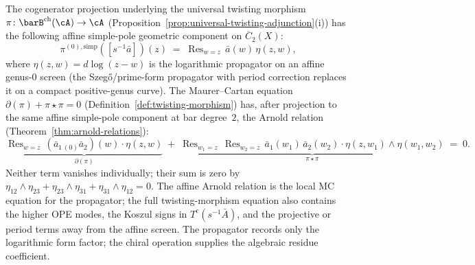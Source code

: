 \begin{proposition}
\label{prop:twisting-morphism-propagator}
The cogenerator projection underlying the universal twisting morphism
$\pi\colon \barB^{\mathrm{ch}}(\cA) \to \cA$
\textup{(}Proposition~\textup{\ref{prop:universal-twisting-adjunction}(i))}
has the following affine simple-pole geometric component on
$\overline C_2(X)$:
\begin{equation}\label{eq:twisting-propagator-config}
\pi^{(0),\mathrm{simp}}([s^{-1}\bar{a}])(z)
\;=\;
\operatorname{Res}_{w=z}\, \bar{a}(w)\,\eta(z,w),
\end{equation}
where $\eta(z,w) = d\log(z - w)$ is the logarithmic propagator on an
affine genus-$0$ screen \textup{(}the Szeg\H{o}/prime-form propagator
with period correction replaces it on a compact positive-genus
curve\textup{)}. The Maurer--Cartan equation
$\partial(\pi) + \pi \star \pi = 0$
\textup{(}Definition~\textup{\ref{def:twisting-morphism})} has, after
projection to the same affine simple-pole component at bar degree~$2$,
the Arnold relation \textup{(}Theorem~\textup{\ref{thm:arnold-relations})}:
\[
\underbrace{\operatorname{Res}_{w=z}\,
(\bar{a}_{1\,(0)}\bar{a}_2)(w) \cdot \eta(z,w)}_{\partial(\pi)}
\;+\;
\underbrace{\operatorname{Res}_{w_1=z}\,
\operatorname{Res}_{w_2=z}\,
\bar{a}_1(w_1)\, \bar{a}_2(w_2)
\cdot \eta(z,w_1) \wedge \eta(w_1,w_2)}_{\pi \star \pi}
\;=\; 0.
\]
Neither term vanishes individually; their sum is zero by
$\eta_{12} \wedge \eta_{23} + \eta_{23} \wedge \eta_{31}
+ \eta_{31} \wedge \eta_{12} = 0$.
The affine Arnold relation is the local MC equation for the propagator;
the full twisting-morphism equation also contains the higher OPE modes,
the Koszul signs in $T^c(s^{-1}\bar A)$, and the projective or period
terms away from the affine screen. The propagator records only the
logarithmic form factor; the chiral operation supplies the algebraic
residue coefficient.
\end{proposition}

